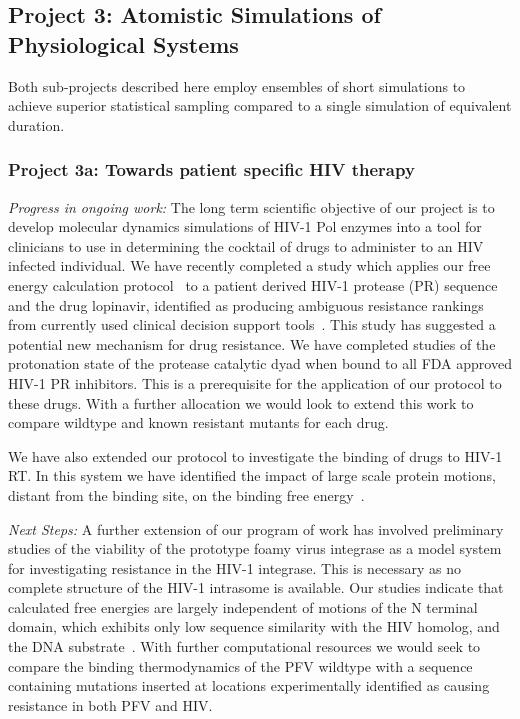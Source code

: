 \documentclass[a4paper,10pt]{article}
\begin{document}
\subsection{Project 3: Atomistic Simulations of Physiological Systems}
Both sub-projects described here employ ensembles of short simulations to achieve superior
statistical sampling compared to a single simulation of equivalent duration. 



\subsubsection{Project 3a: Towards patient specific HIV therapy}

{\it Progress in ongoing work:} The long term scientific objective of our project is to develop molecular dynamics simulations of HIV-1 Pol enzymes into a tool for clinicians to use in determining the cocktail of drugs to administer to an HIV infected individual. We have recently completed a study which applies our free energy calculation protocol~\cite{Ref2} to a patient derived HIV-1 protease (PR) sequence and the drug lopinavir, identified as producing ambiguous resistance rankings from currently used clinical decision support tools~\cite{Ref3}. This study has suggested a potential new mechanism for drug resistance. We have completed studies of the protonation state of the protease catalytic dyad when bound to all FDA approved HIV-1 PR inhibitors. This is a prerequisite for the application of our protocol to these drugs. With a further allocation we would look to extend this work to compare wildtype and known resistant mutants for each drug.

We have also extended our protocol to investigate the binding of drugs to HIV-1 RT. In this system we have identified the impact of large scale protein motions, distant from the binding site, on the binding free energy~\cite{Ref4}.

{\it Next Steps:} A further extension of our program of work has involved preliminary studies of the viability of the prototype foamy virus integrase as a model system for investigating resistance in the HIV-1 integrase. This is necessary as no complete structure of the HIV-1 intrasome is available. Our studies indicate that calculated free energies are largely independent of motions of the N terminal domain, which exhibits only low sequence similarity with the HIV homolog, and the DNA substrate~\cite{Ref5}. With further computational resources we would seek to compare the binding thermodynamics of the PFV wildtype with a sequence containing mutations inserted at locations experimentally identified as causing resistance in both PFV and HIV.
\end{document}
